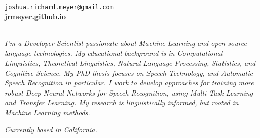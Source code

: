 \documentclass{resume} %
\begin{document}
\vspace{-.25cm}
\begin{center}
\href{mailto:joshua.richard.meyer@gmail.com}{\nolinkurl{joshua.richard.meyer@gmail.com}}\\
\vspace{.15cm}
\href{https://jrmeyer.github.io}{\textbf{jrmeyer.github.io}} \\
\vspace{.15cm}
\href{https://github.com/JRMeyer}{\faGithub} \hspace{.25cm} \href{https://www.linkedin.com/in/josh-r-meyer/}{\faLinkedin} \\

\vspace{.5cm}

\textit{I’m a Developer-Scientist passionate about Machine Learning and open-source language technologies. My educational background is in Computational Linguistics, Theoretical Linguistics, Natural Language Processing, Statistics, and Cognitive Science. My PhD thesis focuses on Speech Technology, and Automatic Speech Recognition in particular. I work to develop approaches for training more robust Deep Neural Networks for Speech Recognition, using Multi-Task Learning and Transfer Learning. My research is linguistically informed, but rooted in Machine Learning methods.}

\vspace{.5cm}

\textit{Currently based in California.}
\end{center}
\end{document}
